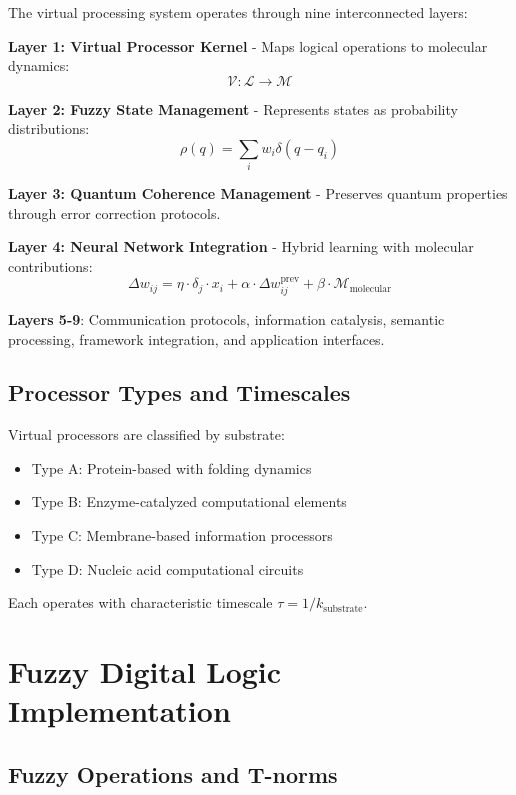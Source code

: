 \documentclass[12pt]{article}
\begin{document}
The virtual processing system operates through nine interconnected layers:

\textbf{Layer 1: Virtual Processor Kernel} - Maps logical operations to molecular dynamics:
\begin{equation}
\mathcal{V}: \mathcal{L} \rightarrow \mathcal{M}
\end{equation}

\textbf{Layer 2: Fuzzy State Management} - Represents states as probability distributions:
\begin{equation}
\rho(q) = \sum_i w_i \delta(q - q_i)
\end{equation}

\textbf{Layer 3: Quantum Coherence Management} - Preserves quantum properties through error correction protocols.

\textbf{Layer 4: Neural Network Integration} - Hybrid learning with molecular contributions:
\begin{equation}
\Delta w_{ij} = \eta \cdot \delta_j \cdot x_i + \alpha \cdot \Delta w_{ij}^{\text{prev}} + \beta \cdot \mathcal{M}_{\text{molecular}}
\end{equation}

\textbf{Layers 5-9}: Communication protocols, information catalysis, semantic processing, framework integration, and application interfaces.

\subsection{Processor Types and Timescales}

Virtual processors are classified by substrate:
\begin{itemize}
\item Type A: Protein-based with folding dynamics
\item Type B: Enzyme-catalyzed computational elements  
\item Type C: Membrane-based information processors
\item Type D: Nucleic acid computational circuits
\end{itemize}

Each operates with characteristic timescale $\tau = 1/k_{\text{substrate}}$.

\section{Fuzzy Digital Logic Implementation}

\subsection{Fuzzy Operations and T-norms}
\end{document}
